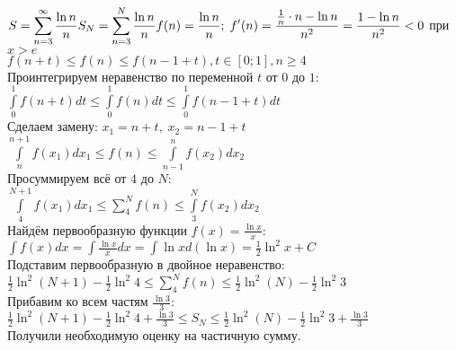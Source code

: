 \documentclass[a4paper]{article}
\begin{document}
    \begin{problem}
        $\displaystyle
        S = \sum\limits_{n=3}^{\infty}\frac{\ln n}{n}\\[3pt]
        S_N = \sum\limits_{n=3}^{N}\frac{\ln n}{n}
        f(n) = \frac{\ln n}{n};\; f'(n) = \frac{\frac{1}{n}\cdot n - \ln n}{n^2} = \frac{1 - \ln n}{n^2} < 0$ при
        $\displaystyle
        x > e
        $\\[3pt]
        $\displaystyle
        f(n + t) \leq f(n) \leq f(n - 1 + t), t \in [0; 1], n\geq 4
        $\\[3pt]
        Проинтегрируем неравенство по переменной $t$ от $0$ до $1$:\\[3pt]
        $\displaystyle
        \int\limits_{0}^1 f(n + t)dt \leq \int\limits_{0}^1 f(n)dt \leq \int\limits_{0}^{1} f(n-1+t)dt
        $\\[3pt]
        Сделаем замену:
        $\displaystyle
        x_1 = n + t,\; x_2 = n - 1 + t
        $\\[3pt]
        $\displaystyle
        \int\limits_{n}^{n+1} f(x_1)dx_1 \leq f(n) \leq \int\limits_{n-1}^{n} f(x_2)dx_2
        $\\[3pt]
        Просуммируем всё от $4$ до $N$:\\[3pt]
        $\displaystyle
        \int\limits_{4}^{N+1} f(x_1)dx_1 \leq \sum\limits_4^Nf(n) \leq \int\limits_{3}^{N} f(x_2)dx_2
        $\\[3pt]
        Найдём первообразную функции $f(x) = \frac{\ln x}{x}$:\\[3pt]
        $\displaystyle
        \int f(x)dx = \int\frac{\ln x}{x}dx = \int\ln xd(\ln x) = \frac{1}{2}\ln^{2}x + C
        $\\[3pt]
        Подставим первообразную в двойное неравенство:\\[3pt]
        $\displaystyle
        \frac{1}{2}\ln^2(N + 1) - \frac{1}{2}\ln^{2}4 \leq \sum\limits_4^Nf(n) \leq
        \frac{1}{2}\ln^2(N) - \frac{1}{2}\ln^{2}3
        $\\[3pt]
        Прибавим ко всем частям $\frac{\ln3}{3}$:\\[3pt]
        $\displaystyle
        \frac{1}{2}\ln^2(N + 1) - \frac{1}{2}\ln^{2}4 + \frac{\ln3}{3} \leq
        S_N \leq
        \frac{1}{2}\ln^2(N) - \frac{1}{2}\ln^{2}3 + \frac{\ln3}{3}
        $\\[3pt]
        Получили необходимую оценку на частичную сумму.
    \end{problem}
\end{document}
